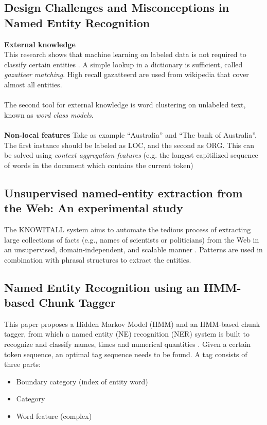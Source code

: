 \documentclass{article}
\begin{document}
\subsection*{Design Challenges and Misconceptions in Named Entity Recognition}
\textbf{External knowledge}\\
This research shows that machine learning on labeled data is not required to classify certain entities \cite{ratinov2009design}. A simple lookup in a dictionary is sufficient, called \textit{gazatteer matching}. High recall gazatteerd are used from wikipedia that cover almost all entities.\\\\
The second tool for external knowledge is word clustering on unlabeled text, known as \textit{word class models}.\\\\
\textbf{Non-local features}
Take as example “Australia” and “The bank of Australia”. The first instance should be labeled
as LOC, and the second as ORG. This can be solved using \textit{context aggregation features} (e.g. the longest capitilized sequence of words in the document which contains the current token)

\subsection*{Unsupervised named-entity extraction from the Web: An experimental study}
The KNOWITALL system aims to automate the tedious process of extracting large collections of
facts (e.g., names of scientists or politicians) from the Web in an unsupervised, domain-independent,
and scalable manner \cite{etzioni2005unsupervised}. Patterns are used in combination with phrasal structures to extract the entities.

\subsection*{Named Entity Recognition using an HMM-based Chunk Tagger}
This paper proposes a Hidden Markov Model (HMM) and an HMM-based chunk tagger, from which a named entity (NE)
recognition (NER) system is built to recognize and classify names, times and numerical quantities \cite{zhou2002named}. Given a certain token sequence, an optimal tag sequence needs to be found. A tag consists of three parts:
\begin{itemize}
    \item Boundary category (index of entity word)
    \item Category
    \item Word feature (complex)
\end{itemize}
\end{document}
